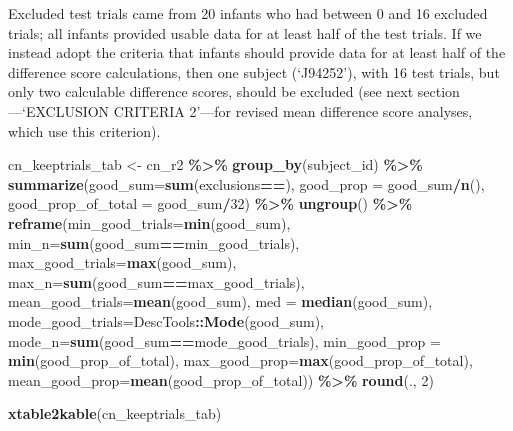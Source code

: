 \documentclass[
  doc,floatsintext]{apa6}
\newenvironment{Shaded}{\begin{snugshade}}{\end{snugshade}}
\newcommand{\AttributeTok}[1]{\textcolor[rgb]{0.13,0.29,0.53}{#1}}
\newcommand{\DecValTok}[1]{\textcolor[rgb]{0.00,0.00,0.81}{#1}}
\newcommand{\FunctionTok}[1]{\textcolor[rgb]{0.13,0.29,0.53}{\textbf{#1}}}
\newcommand{\NormalTok}[1]{#1}
\newcommand{\OtherTok}[1]{\textcolor[rgb]{0.56,0.35,0.01}{#1}}
\newcommand{\SpecialCharTok}[1]{\textcolor[rgb]{0.81,0.36,0.00}{\textbf{#1}}}
\newcommand{\StringTok}[1]{\textcolor[rgb]{0.31,0.60,0.02}{#1}}
\begin{document}
Excluded test trials came from 20 infants who had between 0 and 16 excluded trials; all infants provided usable data for at least half of the test trials. If we instead adopt the criteria that infants should provide data for at least half of the difference score calculations, then one subject (`J94252'), with 16 test trials, but only two calculable difference scores, should be excluded (see next section---`EXCLUSION CRITERIA 2'---for revised mean difference score analyses, which use this criterion).

\begin{Shaded}
\begin{Highlighting}[]
\NormalTok{cn\_keeptrials\_tab }\OtherTok{\textless{}{-}}\NormalTok{ cn\_r2 }\SpecialCharTok{\%\textgreater{}\%}
  \FunctionTok{group\_by}\NormalTok{(subject\_id) }\SpecialCharTok{\%\textgreater{}\%}
  \FunctionTok{summarize}\NormalTok{(}\AttributeTok{good\_sum=}\FunctionTok{sum}\NormalTok{(exclusions}\SpecialCharTok{==}\StringTok{\textquotesingle{}\textquotesingle{}}\NormalTok{),}
            \AttributeTok{good\_prop =}\NormalTok{ good\_sum}\SpecialCharTok{/}\FunctionTok{n}\NormalTok{(),}
            \AttributeTok{good\_prop\_of\_total =}\NormalTok{ good\_sum}\SpecialCharTok{/}\DecValTok{32}\NormalTok{) }\SpecialCharTok{\%\textgreater{}\%}
  \FunctionTok{ungroup}\NormalTok{() }\SpecialCharTok{\%\textgreater{}\%}
  \FunctionTok{reframe}\NormalTok{(}\AttributeTok{min\_good\_trials=}\FunctionTok{min}\NormalTok{(good\_sum),}
            \AttributeTok{min\_n=}\FunctionTok{sum}\NormalTok{(good\_sum}\SpecialCharTok{==}\NormalTok{min\_good\_trials),}
            \AttributeTok{max\_good\_trials=}\FunctionTok{max}\NormalTok{(good\_sum),}
            \AttributeTok{max\_n=}\FunctionTok{sum}\NormalTok{(good\_sum}\SpecialCharTok{==}\NormalTok{max\_good\_trials),}
            \AttributeTok{mean\_good\_trials=}\FunctionTok{mean}\NormalTok{(good\_sum),}
            \AttributeTok{med =} \FunctionTok{median}\NormalTok{(good\_sum),}
            \AttributeTok{mode\_good\_trials=}\NormalTok{DescTools}\SpecialCharTok{::}\FunctionTok{Mode}\NormalTok{(good\_sum),}
            \AttributeTok{mode\_n=}\FunctionTok{sum}\NormalTok{(good\_sum}\SpecialCharTok{==}\NormalTok{mode\_good\_trials),}
            \AttributeTok{min\_good\_prop =} \FunctionTok{min}\NormalTok{(good\_prop\_of\_total),}
            \AttributeTok{max\_good\_prop=}\FunctionTok{max}\NormalTok{(good\_prop\_of\_total),}
            \AttributeTok{mean\_good\_prop=}\FunctionTok{mean}\NormalTok{(good\_prop\_of\_total)) }\SpecialCharTok{\%\textgreater{}\%}
  \FunctionTok{round}\NormalTok{(., }\DecValTok{2}\NormalTok{)}

\FunctionTok{xtable2kable}\NormalTok{(cn\_keeptrials\_tab)}
\end{Highlighting}
\end{Shaded}
\end{document}
